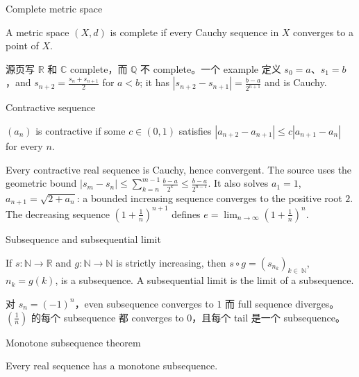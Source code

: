 \begin{definition}{Complete metric space}

A metric space \(\left( {X,d} \right)\) is complete if every Cauchy sequence in \(X\) converges to a point of \(X\).

\end{definition}

源页写 \(\mathbb{R}\) 和 \(\mathbb{C}\) complete，而 \(\mathbb{Q}\) 不 complete。一个 example 定义 \(s_{0} = a\)、\(s_{1} = b\)，and \(s_{n + 2} = \frac{s_{n} + s_{n + 1}}{2}\) for \(a < b\); it has \(\left| {s_{n + 2} - s_{n + 1}} \right| = \frac{b - a}{2^{n + 1}}\) and is Cauchy.

\begin{definition}{Contractive sequence}

\(\left( a_{n} \right)\) is contractive if some \(c \in \left( {0,1} \right)\) satisfies \(\left| {a_{n + 2} - a_{n + 1}} \right| \leq c\left| {a_{n + 1} - a_{n}} \right|\) for every \(n\).

\end{definition}

Every contractive real sequence is Cauchy, hence convergent. The source uses the geometric bound \(\left| {s_{m} - s_{n}} \right| \leq \sum_{k = n}^{m - 1}\frac{b - a}{2^{k}} \leq \frac{b - a}{2^{n - 1}}\). It also solves \(a_{1} = 1\), \(a_{n + 1} = \sqrt{2 + a_{n}}\): a bounded increasing sequence converges to the positive root \(2\). The decreasing sequence \(\left( {1 + \frac{1}{n}} \right)^{n + 1}\) defines \(e = \lim_{n\rightarrow\infty}\left( {1 + \frac{1}{n}} \right)^{n}\).

\begin{definition}{Subsequence and subsequential limit}

If \(s:\mathbb{N}\rightarrow\mathbb{R}\) and \(g:\mathbb{N}\rightarrow\mathbb{N}\) is strictly increasing, then \(s \circ g = \left( s_{n_{k}} \right)_{k \in \ \mathbb{N}}\), \(n_{k} = g(k)\), is a subsequence. A subsequential limit is the limit of a subsequence.

\end{definition}

对 \(s_{n} = \left( {- 1} \right)^{n}\)，even subsequence converges to \(1\) 而 full sequence diverges。\(\left( \frac{1}{n} \right)\) 的每个 subsequence 都 converges to \(0\)，且每个 tail 是一个 subsequence。

\begin{theorem}{Monotone subsequence theorem}

Every real sequence has a monotone subsequence.

\end{theorem}

